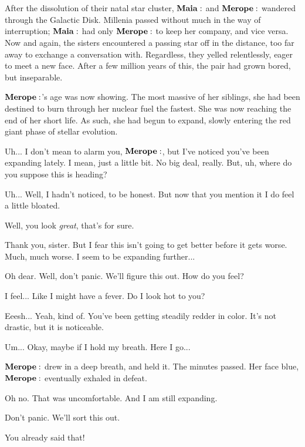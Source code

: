 \documentclass[main.tex]{subfiles}
\begin{document}
\section{}

After the dissolution of their natal star cluster, $\Maia$ and $\Merope$ wandered through the Galactic Disk.  Millenia passed without much in the way of interruption; $\Maia$ had only $\Merope$ to keep her company, and vice versa.  Now and again, the sisters encountered a passing star off in the distance, too far away to exchange a conversation with.  Regardless, they yelled relentlessly, eager to meet a new face.  After a few million years of this, the pair had grown bored, but inseparable.

$\Merope$'s age was now showing.  The most massive of her siblings, she had been destined to burn through her nuclear fuel the fastest.  She was now reaching the end of her short life.  As such, she had begun to expand, slowly entering the red giant phase of stellar evolution.  

\Maia Uh... I don't mean to alarm you, $\Merope$, but I've noticed you've been expanding lately.  I mean, just a little bit.  No big deal, really.  But, uh, where do you suppose this is heading?

\Merope Uh... Well, I hadn't noticed, to be honest.  But now that you mention it I do feel a little bloated.  

\Maia Well, you look \textit{great}, that's for sure.

\Merope Thank you, sister.  But I fear this isn't going to get better before it gets worse.  Much, much worse.  I seem to be expanding further...

\Maia Oh dear.  Well, don't panic.  We'll figure this out.  How do you feel?

\Merope I feel... Like I might have a fever.  Do I look hot to you?

\Maia Eeesh... Yeah, kind of.  You've been getting steadily redder in color.  It's not drastic, but it is noticeable.

\Merope Um... Okay, maybe if I hold my breath.  Here I go...

$\Merope$ drew in a deep breath, and held it.  The minutes passed.  Her face blue, $\Merope$ eventually exhaled in defeat.  

\Merope Oh no.  That was uncomfortable.  And I am still expanding.

\Maia Don't panic.  We'll sort this out.

\Merope You already said that!
\end{document}
